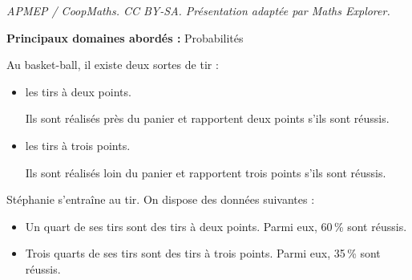 \documentclass[10pt]{article}
\begin{document}
\noindent\textit{APMEP / CoopMaths. CC BY-SA. Présentation adaptée par Maths Explorer.}\par\medskip
\textbf{Principaux domaines abordés :} Probabilités

\medskip

Au basket-ball, il existe deux sortes de tir :

\begin{itemize}
\item les tirs à deux points.

Ils sont réalisés près du panier et rapportent deux points s'ils sont réussis.
\item les tirs à trois points.

Ils sont réalisés loin du panier et rapportent trois points s'ils sont réussis.
\end{itemize}

\smallskip

Stéphanie s'entraîne au tir. On dispose des données suivantes :

\begin{itemize}
\item[$\bullet~~$] Un quart de ses tirs sont des tirs à deux points. Parmi eux, 60\,\% sont réussis.
\item[$\bullet~~$] Trois quarts de ses tirs sont des tirs à trois points. Parmi eux, 35\,\% sont réussis.
\end{itemize}

\medskip
\end{document}
